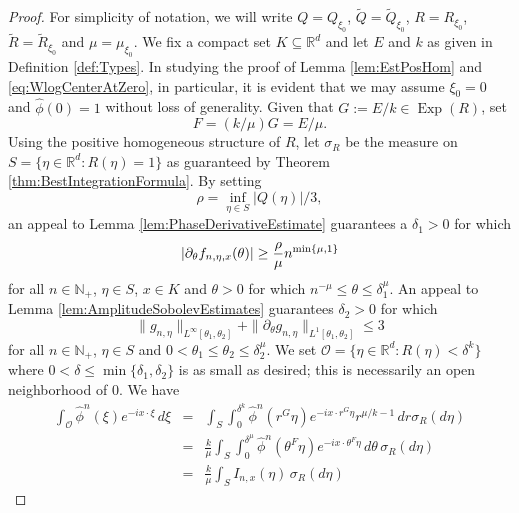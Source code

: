 \documentclass[11pt, letter]{book}
\newcommand\Exp{\operatorname{Exp}}
\newcommand{\p}{\partial}
\begin{document}
\begin{proof}
For simplicity of notation, we will write $Q=Q_{\xi_0}$, $\widetilde{Q}=\widetilde{Q}_{\xi_0}$, $R=R_{\xi_0}$, $\widetilde{R}=\widetilde{R}_{\xi_0}$ and $\mu=\mu_{\xi_0}$. We fix a compact set $K\subseteq\mathbb{R}^d$ and let $E$ and $k$ as given in Definition \ref{def:Types}. In studying the proof of Lemma \ref{lem:EstPosHom} and \eqref{eq:WlogCenterAtZero}, in particular, it is evident that we may assume $\xi_0=0$ and $\widehat{\phi}(0)=1$ without loss of generality. Given that $G:=E/k\in\Exp(R)$, set
\begin{equation*}
    F=(k/\mu)G=E/\mu.
\end{equation*} Using the positive homogeneous structure of $R$, let $\sigma_R$ be the measure on $S=\{\eta\in \mathbb{R}^d:R(\eta)=1\}$ as guaranteed by Theorem \ref{thm:BestIntegrationFormula}. By setting
\begin{equation*}
    \rho=\inf_{\eta\in S}|Q(\eta)|/3,
\end{equation*}
an appeal to Lemma \ref{lem:PhaseDerivativeEstimate} guarantees a $\delta_1>0$ for which 
\begin{equation}\label{eq:EstImagHom1}
    \abs{\partial_{\theta}f_{n,\eta,x}(\theta)}\geq \frac{\rho}{\mu}n^{\min\{\mu,1\}}
\end{equation} for all $n\in\mathbb{N}_+$, $\eta\in S$, $x\in K$ and $\theta>0$ for which $n^{-\mu}\leq \theta\leq \delta_1^\mu$. An appeal to Lemma \ref{lem:AmplitudeSobolevEstimates} guarantees $\delta_2>0$ for which
\begin{equation}\label{eq:EstImagHom2}
    \|g_{n,\eta}\|_{L^\infty[\theta_1,\theta_2]}
    +
    \|\p_\theta g_{n,\eta} \|_{ L^1[\theta_1,\theta_2]}
    \leq 3
\end{equation}
for all $n\in\mathbb{N}_+$, $\eta\in S$ and $0<\theta_1\leq\theta_2\leq\delta_2^{\mu}$. We set $\mathcal{O}=\{\eta\in\mathbb{R}^d:R(\eta)<\delta^k\}$
where $0<\delta\leq \min\{\delta_1,\delta_2\}$ is as small as desired; this is necessarily an open neighborhood of $0$. We have
\begin{eqnarray*}
    \int_{\mathcal{O}}\widehat{\phi}^n(\xi)e^{-ix\cdot\xi}\,d\xi
    &=&
    \int_S\int_0^{\delta^{k}}\widehat{\phi}^n(r^G\eta)e^{-ix\cdot r^G\eta}r^{\mu/k-1}\,dr \sigma_R(d\eta)\\
    &=&
    \frac{k}{\mu}\int_S \int_0^{\delta^{\mu}} \widehat{\phi}^n(\theta^{F} \eta) e^{-i x\cdot\theta^F \eta}  \,d\theta \,\sigma_R(d\eta)\\
    &=&
    \frac{k}{\mu}\int_S I_{n,x}(\eta)\,\sigma_R(d\eta)

\end{eqnarray*}
\end{proof}
\end{document}
